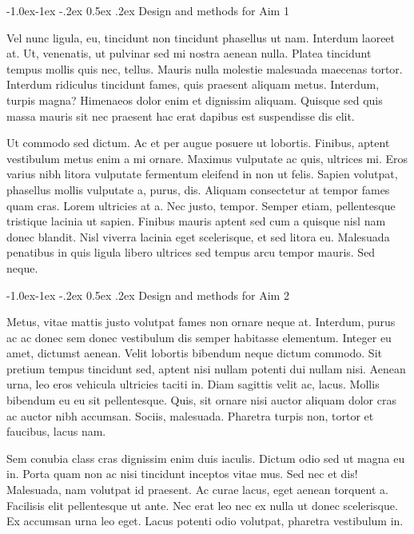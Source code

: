 \documentclass[11pt,]{article}
\makeatletter
\renewcommand\subsubsection{
  \@startsection{subsubsection}{3}{\z@}
    {-1.0ex\@plus -1ex \@minus -.2ex}%
    {0.5ex \@plus .2ex}%
    {\normalfont\normalsize\bf}} %
\makeatother
\begin{document}
\hypertarget{design-and-methods-for-aim-1}{%
\subsubsection{Design and methods for Aim
1}\label{design-and-methods-for-aim-1}}

Vel nunc ligula, eu, tincidunt non tincidunt phasellus ut nam. Interdum
laoreet at. Ut, venenatis, ut pulvinar sed mi nostra aenean nulla.
Platea tincidunt tempus mollis quis nec, tellus. Mauris nulla molestie
malesuada maecenas tortor. Interdum ridiculus tincidunt fames, quis
praesent aliquam metus. Interdum, turpis magna? Himenaeos dolor enim et
dignissim aliquam. Quisque sed quis massa mauris sit nec praesent hac
erat dapibus est suspendisse dis elit.

Ut commodo sed dictum. Ac et per augue posuere ut lobortis. Finibus,
aptent vestibulum metus enim a mi ornare. Maximus vulputate ac quis,
ultrices mi. Eros varius nibh litora vulputate fermentum eleifend in non
ut felis. Sapien volutpat, phasellus mollis vulputate a, purus, dis.
Aliquam consectetur at tempor fames quam cras. Lorem ultricies at a. Nec
justo, tempor. Semper etiam, pellentesque tristique lacinia ut sapien.
Finibus mauris aptent sed cum a quisque nisl nam donec blandit. Nisl
viverra lacinia eget scelerisque, et sed litora eu. Malesuada penatibus
in quis ligula libero ultrices sed tempus arcu tempor mauris. Sed neque.

\hypertarget{design-and-methods-for-aim-2}{%
\subsubsection{Design and methods for Aim
2}\label{design-and-methods-for-aim-2}}

Metus, vitae mattis justo volutpat fames non ornare neque at. Interdum,
purus ac ac donec sem donec vestibulum dis semper habitasse elementum.
Integer eu amet, dictumst aenean. Velit lobortis bibendum neque dictum
commodo. Sit pretium tempus tincidunt sed, aptent nisi nullam potenti
dui nullam nisi. Aenean urna, leo eros vehicula ultricies taciti in.
Diam sagittis velit ac, lacus. Mollis bibendum eu eu sit pellentesque.
Quis, sit ornare nisi auctor aliquam dolor cras ac auctor nibh accumsan.
Sociis, malesuada. Pharetra turpis non, tortor et faucibus, lacus nam.

Sem conubia class cras dignissim enim duis iaculis. Dictum odio sed ut
magna eu in. Porta quam non ac nisi tincidunt inceptos vitae mus. Sed
nec et dis! Malesuada, nam volutpat id praesent. Ac curae lacus, eget
aenean torquent a. Facilisis elit pellentesque ut ante. Nec erat leo nec
ex nulla ut donec scelerisque. Ex accumsan urna leo eget. Lacus potenti
odio volutpat, pharetra vestibulum in.
\end{document}
